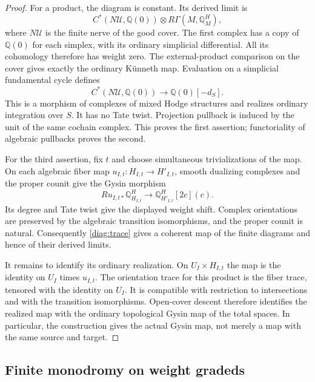 \begin{proof}
 For a product, the diagram is constant.  Its derived limit is
 \[
 C^*(N\mathcal U,\mathbb Q(0))\otimes R\Gamma(M,\mathbb Q_M^H),
 \]
 where $N\mathcal U$ is the finite nerve of the good cover.  The
 first complex has a copy of $\mathbb Q(0)$ for each simplex, with
 its ordinary simplicial differential.  All its cohomology therefore
 has weight zero.  The external-product comparison on the cover
 gives exactly the ordinary K\"unneth map.  Evaluation on a simplicial
 fundamental cycle defines
 \[
 C^*(N\mathcal U,\mathbb Q(0))\longrightarrow
       \mathbb Q(0)[-d_S].
 \]
 This is a morphism of complexes of mixed Hodge structures and
 realizes ordinary integration over $S$.  It has no Tate twist.
 Projection pullback is induced by the unit of the same cochain
 complex.  This proves the first assertion; functoriality of algebraic
 pullbacks proves the second.

 For the third assertion, fix $t$ and choose simultaneous
 trivializations of the map.  On each algebraic fiber map
 $u_{I,t}:H_{I,t}\to H'_{I,t}$, smooth
 dualizing complexes and the proper counit give the Gysin morphism
 \begin{equation}
  \label{diag:trace}
  Ru_{I,t*}\mathbb Q^H_{H_{I,t}}\longrightarrow
       \mathbb Q^H_{H'_{I,t}}[2c](c).
 \end{equation}
 Its degree and Tate twist give the displayed weight shift.
 Complex orientations are preserved by the algebraic transition
 isomorphisms, and the proper counit is natural.  Consequently
 \eqref{diag:trace} gives a coherent map of the finite diagrams and
 hence of their derived limits.

 It remains to identify its ordinary realization.  On
 $U_I\times H_{I,t}$ the map is the identity on $U_I$ times $u_{I,t}$.
 The orientation trace
 for this product is the fiber trace, tensored with the identity on
 $U_I$.  It is compatible with restriction to intersections and with
 the transition isomorphisms.  Open-cover descent therefore identifies
 the realized map with the ordinary topological Gysin map of the
 total spaces.  In particular, the construction gives the actual
 Gysin map, not merely a map with the same source and target.
\end{proof}

\subsection{Finite monodromy on weight gradeds}

